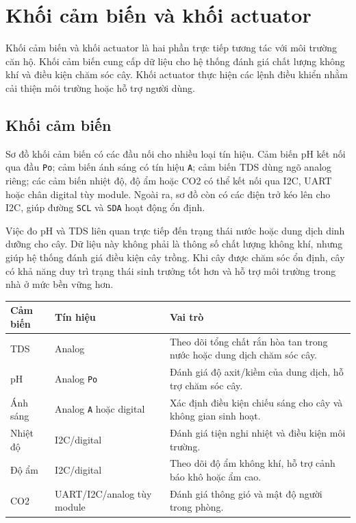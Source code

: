 \section{Khối cảm biến và khối actuator}
Khối cảm biến và khối actuator là hai phần trực tiếp tương tác với môi trường căn hộ. Khối cảm biến cung cấp dữ liệu cho hệ thống đánh giá chất lượng không khí và điều kiện chăm sóc cây. Khối actuator thực hiện các lệnh điều khiển nhằm cải thiện môi trường hoặc hỗ trợ người dùng.

\subsection{Khối cảm biến}
Sơ đồ khối cảm biến có các đầu nối cho nhiều loại tín hiệu. Cảm biến pH kết nối qua đầu \texttt{Po}; cảm biến ánh sáng có tín hiệu \texttt{A}; cảm biến TDS dùng ngõ analog riêng; các cảm biến nhiệt độ, độ ẩm hoặc CO2 có thể kết nối qua I2C, UART hoặc chân digital tùy module. Ngoài ra, sơ đồ còn có các điện trở kéo lên cho I2C, giúp đường \texttt{SCL} và \texttt{SDA} hoạt động ổn định.

Việc đo pH và TDS liên quan trực tiếp đến trạng thái nước hoặc dung dịch dinh dưỡng cho cây. Dữ liệu này không phải là thông số chất lượng không khí, nhưng giúp hệ thống đánh giá điều kiện cây trồng. Khi cây được chăm sóc ổn định, cây có khả năng duy trì trạng thái sinh trưởng tốt hơn và hỗ trợ môi trường trong nhà ở mức bền vững hơn.

\begin{longtable}{|p{3.2cm}|p{3.2cm}|p{6.5cm}|}
\hline
\textbf{Cảm biến} & \textbf{Tín hiệu} & \textbf{Vai trò} \\
\hline
TDS & Analog & Theo dõi tổng chất rắn hòa tan trong nước hoặc dung dịch chăm sóc cây. \\
\hline
pH & Analog \texttt{Po} & Đánh giá độ axit/kiềm của dung dịch, hỗ trợ chăm sóc cây. \\
\hline
Ánh sáng & Analog \texttt{A} hoặc digital & Xác định điều kiện chiếu sáng cho cây và không gian sinh hoạt. \\
\hline
Nhiệt độ & I2C/digital & Đánh giá tiện nghi nhiệt và điều kiện môi trường. \\
\hline
Độ ẩm & I2C/digital & Theo dõi độ ẩm không khí, hỗ trợ cảnh báo khô hoặc ẩm cao. \\
\hline
CO2 & UART/I2C/analog tùy module & Đánh giá thông gió và mật độ người trong phòng. \\
\hline
\end{longtable}

